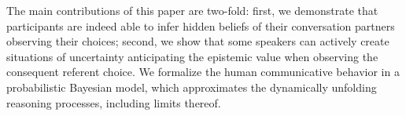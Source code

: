 \documentclass[10pt,a4paper]{article}
\newcommand{\sem}[1]{\mbox{$[\![$#1$]\!]$}}
\newcommand{\gcs}[1]{\textcolor{blue}{[gcs: #1]}}
\begin{document}
The main contributions of this paper are two-fold: first, we demonstrate that participants are indeed able to infer hidden beliefs of their conversation partners observing their choices; second, we show that some speakers can actively create situations of uncertainty anticipating the epistemic value when observing the consequent referent choice. 
We formalize the human communicative behavior in a probabilistic Bayesian model, which approximates the dynamically unfolding reasoning processes, including limits thereof. 



\end{document}
